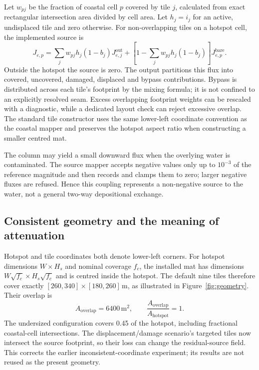 Let $w_{pj}$ be the fraction of coastal cell $p$ covered by tile $j$, calculated from exact rectangular intersection area divided by cell area. Let $h_j=i_j$ for an active, undisplaced tile and zero otherwise. For non-overlapping tiles on a hotspot cell, the implemented source is
\begin{equation}
 J_{e,p}=\sum_j w_{pj}h_j(1-b_j)J_{e,j}^{\mathrm{out}}
 +\left[1-\sum_j w_{pj}h_j(1-b_j)\right]J_{e,p}^{\mathrm{bare}}.
 \label{eq:source_mixing}
\end{equation}
Outside the hotspot the source is zero. The output partitions this flux into covered, uncovered, damaged, displaced and bypass contributions. Bypass is distributed across each tile's footprint by the mixing formula; it is not confined to an explicitly resolved seam. Excess overlapping footprint weights can be rescaled with a diagnostic, while a dedicated layout check can reject excessive overlap. The standard tile constructor uses the same lower-left coordinate convention as the coastal mapper and preserves the hotspot aspect ratio when constructing a smaller centred mat.

The column may yield a small downward flux when the overlying water is contaminated. The source mapper accepts negative values only up to $10^{-3}$ of the reference magnitude and then records and clamps them to zero; larger negative fluxes are refused. Hence this coupling represents a non-negative source to the water, not a general two-way depositional exchange.

\subsection{Consistent geometry and the meaning of attenuation}
\label{sec:geometry_discrepancy}

Hotspot and tile coordinates both denote lower-left corners. For hotspot dimensions $W\times H_s$ and nominal coverage $f_c$, the installed mat has dimensions $W\sqrt{f_c}\times H_s\sqrt{f_c}$ and is centred inside the hotspot. The default nine tiles therefore cover exactly $[260,340]\times[180,260]\,\mathrm{m}$, as illustrated in Figure~\ref{fig:geometry}. Their overlap is
\begin{equation}
 A_{\mathrm{overlap}}=6400\,\mathrm{m^2},\qquad
 \frac{A_{\mathrm{overlap}}}{A_{\mathrm{hotspot}}}=1.
 \label{eq:geometry_overlap}
\end{equation}
The undersized configuration covers 0.45 of the hotspot, including fractional coastal-cell intersections. The displacement/damage scenario's targeted tiles now intersect the source footprint, so their loss can change the residual-source field. This corrects the earlier inconsistent-coordinate experiment; its results are not reused as the present geometry.

